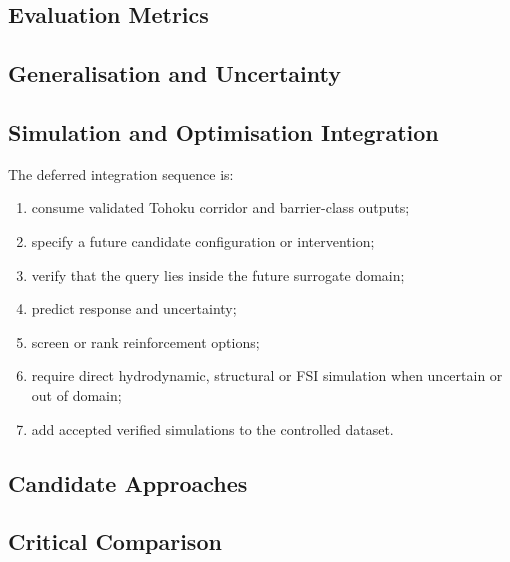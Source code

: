 
\subsection{Evaluation Metrics}
\label{sec:res-ml-int-evaluation-metrics}


\subsection{Generalisation and Uncertainty}
\label{sec:res-ml-int-generalisation-uncertainty}


\subsection{Simulation and Optimisation Integration}
\label{sec:res-ml-int-simulation-optimisation-integration}

The deferred integration sequence is:
\begin{enumerate}
  \item consume validated Tohoku corridor and barrier-class outputs;
  \item specify a future candidate configuration or intervention;
  \item verify that the query lies inside the future surrogate domain;
  \item predict response and uncertainty;
  \item screen or rank reinforcement options;
  \item require direct hydrodynamic, structural or FSI simulation when
    uncertain or out of domain;
  \item add accepted verified simulations to the controlled dataset.
\end{enumerate}

\subsection{Candidate Approaches}
\label{sec:res-ml-int-candidate-approaches}


\subsection{Critical Comparison}
\label{sec:res-ml-int-critical-comparison}

